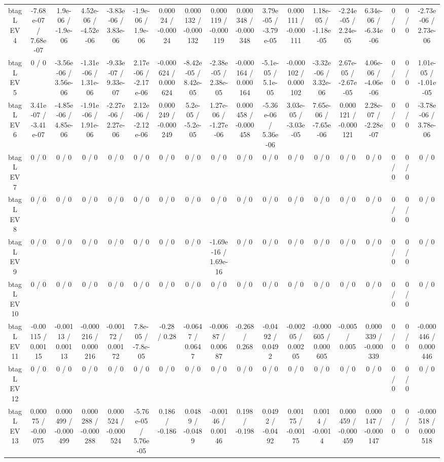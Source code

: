 \documentclass[10pt]{article}
\begin{document}
\begin{table}[htbp]
\begin{center}
\begin{tabular}{|c|c|c|c|c|c|c|c|c|c|c|c|c|c|c|c|c|c|}
  btag L EV 4 & -7.68e-07 / 7.68e-07 & 1.9e-06 / -1.9e-06 & 4.52e-06 / -4.52e-06 & -3.83e-06 / 3.83e-06 & -1.9e-06 / 1.9e-06 & 0.00024 / -0.00024 & 0.000132 / -0.000132 & 0.000119 / -0.000119 & 0.000348 / -0.000348 & 3.79e-05 / -3.79e-05 & 0.000111 / -0.000111 & 1.18e-05 / -1.18e-05 & -2.24e-05 / 2.24e-05 & 6.34e-06 / -6.34e-06 & 0 / 0 & 0 / 0 & -2.73e-06 / 2.73e-06 \\ 
  btag L EV 5 & 0 / 0 & -3.56e-06 / 3.56e-06 & -1.31e-06 / 1.31e-06 & -9.33e-07 / 9.33e-07 & 2.17e-06 / -2.17e-06 & -0.000624 / 0.000624 & -8.42e-05 / 8.42e-05 & -2.38e-05 / 2.38e-05 & -0.000164 / 0.000164 & -5.1e-05 / 5.1e-05 & -0.000102 / 0.000102 & -3.32e-06 / 3.32e-06 & 2.67e-05 / -2.67e-05 & 4.06e-06 / -4.06e-06 & 0 / 0 & 0 / 0 & 1.01e-05 / -1.01e-05 \\ 
  btag L EV 6 & 3.41e-07 / -3.41e-07 & -4.85e-06 / 4.85e-06 & -1.91e-06 / 1.91e-06 & -2.27e-06 / 2.27e-06 & 2.12e-06 / -2.12e-06 & 0.000249 / -0.000249 & 5.2e-05 / -5.2e-05 & 1.27e-06 / -1.27e-06 & 0.000458 / -0.000458 & -5.36e-06 / 5.36e-06 & 3.03e-05 / -3.03e-05 & 7.65e-06 / -7.65e-06 & 0.000121 / -0.000121 & 2.28e-07 / -2.28e-07 & 0 / 0 & 0 / 0 & -3.78e-06 / 3.78e-06 \\ 
  btag L EV 7 & 0 / 0 & 0 / 0 & 0 / 0 & 0 / 0 & 0 / 0 & 0 / 0 & 0 / 0 & 0 / 0 & 0 / 0 & 0 / 0 & 0 / 0 & 0 / 0 & 0 / 0 & 0 / 0 & 0 / 0 & 0 / 0 & 0 / 0 \\ 
  btag L EV 8 & 0 / 0 & 0 / 0 & 0 / 0 & 0 / 0 & 0 / 0 & 0 / 0 & 0 / 0 & 0 / 0 & 0 / 0 & 0 / 0 & 0 / 0 & 0 / 0 & 0 / 0 & 0 / 0 & 0 / 0 & 0 / 0 & 0 / 0 \\ 
  btag L EV 9 & 0 / 0 & 0 / 0 & 0 / 0 & 0 / 0 & 0 / 0 & 0 / 0 & 0 / 0 & -1.69e-16 / 1.69e-16 & 0 / 0 & 0 / 0 & 0 / 0 & 0 / 0 & 0 / 0 & 0 / 0 & 0 / 0 & 0 / 0 & 0 / 0 \\ 
  btag L EV 10 & 0 / 0 & 0 / 0 & 0 / 0 & 0 / 0 & 0 / 0 & 0 / 0 & 0 / 0 & 0 / 0 & 0 / 0 & 0 / 0 & 0 / 0 & 0 / 0 & 0 / 0 & 0 / 0 & 0 / 0 & 0 / 0 & 0 / 0 \\ 
  btag L EV 11 & -0.00115 / 0.00115 & -0.00113 / 0.00113 & -0.000216 / 0.000216 & -0.00172 / 0.00172 & 7.8e-05 / -7.8e-05 & -0.28 / 0.28 & -0.0647 / 0.0647 & -0.00687 / 0.00687 & -0.268 / 0.268 & -0.0492 / 0.0492 & -0.00205 / 0.00205 & -0.000605 / 0.000605 & -0.005 / 0.005 & 0.000339 / -0.000339 & 0 / 0 & 0 / 0 & -0.000446 / 0.000446 \\ 
  btag L EV 12 & 0 / 0 & 0 / 0 & 0 / 0 & 0 / 0 & 0 / 0 & 0 / 0 & 0 / 0 & 0 / 0 & 0 / 0 & 0 / 0 & 0 / 0 & 0 / 0 & 0 / 0 & 0 / 0 & 0 / 0 & 0 / 0 & 0 / 0 \\ 
  btag L EV 13 & 0.00075 / -0.00075 & 0.000499 / -0.000499 & 0.000288 / -0.000288 & 0.000524 / -0.000524 & -5.76e-05 / 5.76e-05 & 0.186 / -0.186 & 0.0489 / -0.0489 & -0.00146 / 0.00146 & 0.198 / -0.198 & 0.0492 / -0.0492 & 0.00175 / -0.00175 & 0.0014 / -0.0014 & 0.000459 / -0.000459 & 0.000147 / -0.000147 & 0 / 0 & 0 / 0 & -0.000518 / 0.000518 \\ 

\end{tabular}
\end{center}
\end{table}
\end{document}
